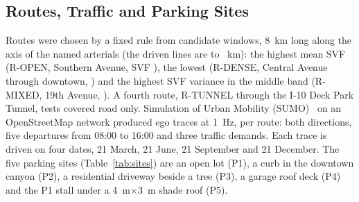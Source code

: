 \documentclass[lettersize,journal]{IEEEtran}
\begin{document}
\subsection{Routes, Traffic and Parking Sites}
Routes were chosen by a fixed rule from \RouteCandidates{} candidate windows, \SI{8}{km} long along the axis of the named arterials (the driven lines are \RouteMixedLen{} to \RouteOpenLen~km): the highest mean SVF (R-OPEN, Southern Avenue, SVF \RouteOpenSvf), the lowest (R-DENSE, Central Avenue through downtown, \RouteDenseSvf) and the highest SVF variance in the middle band (R-MIXED, 19th Avenue, \RouteMixedSvf). A fourth route, R-TUNNEL through the I-10 Deck Park Tunnel, tests covered road only. Simulation of Urban Mobility (SUMO)~\cite{ref_sumo} on an OpenStreetMap network produced \PsixTraces{} ego traces at \SI{1}{Hz}, \PsixDenseTraces{} per route: both directions, five departures from 08:00 to 16:00 and three traffic demands. Each trace is driven on four dates, 21 March, 21 June, 21 September and 21 December. The five parking sites (Table~\ref{tab:sites}) are an open lot (P1), a curb in the downtown canyon (P2), a residential driveway beside a tree (P3), a garage roof deck (P4) and the P1 stall under a \SI{4}{m}$\times$\SI{3}{m} shade roof (P5).
\end{document}
